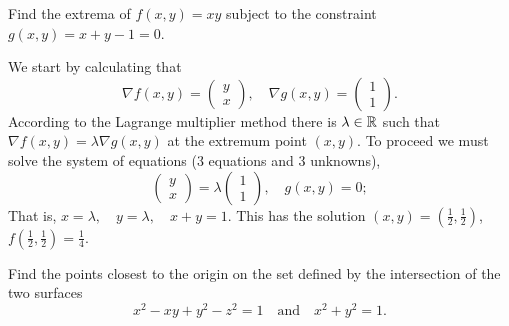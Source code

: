 \begin{task}
    Find the extrema of \(f(x,y) = xy\) subject to the constraint \(g(x,y) = x+y-1 =0\).
\end{task}

\begin{solution}
    We start by calculating that
    \[
        \nabla f(x,y) = \left(\begin{smallmatrix}
                y\\ x
            \end{smallmatrix}\right),
        \quad
        \nabla g(x,y) = \left(\begin{smallmatrix}
                1\\ 1
            \end{smallmatrix}\right).
    \]
    According to the Lagrange multiplier method there is \(\lambda\in \mathbb{R}\) such that \(\nabla f(x,y) = \lambda \nabla g(x,y)\) at the extremum point \((x,y)\).
    To proceed we must solve the system of equations (3 equations and 3 unknowns),
    \[
        \left(\begin{smallmatrix}
                y\\ x
            \end{smallmatrix}\right)
        = \lambda \left(\begin{smallmatrix}
                1\\ 1
            \end{smallmatrix}\right),
        \quad g(x,y) =0;
    \]
    That is,
    \( x = \lambda, \quad
    y = \lambda, \quad
    x+y = 1
    \).
    This has the solution \((x,y) = (\frac{1}{2},\frac{1}{2})\), \(f(\frac{1}{2},\frac{1}{2})= \frac{1}{4}\).
\end{solution}



\begin{task}
    Find the points closest to the origin on the set defined by the intersection of the two surfaces
    \[
        x^2 - xy + y^2 - z^2 = 1
        \quad \text{and} \quad
        x^2 + y^2 = 1.
    \]
\end{task}

